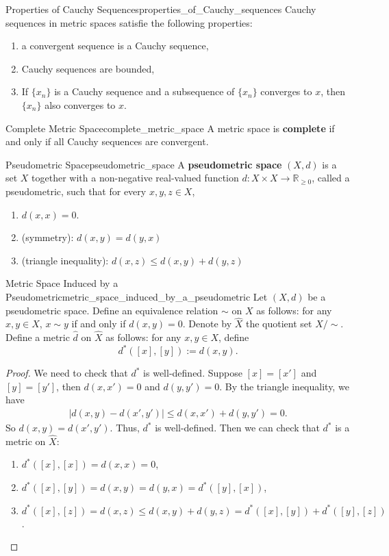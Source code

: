 \documentclass{report}
\begin{document}
\begin{proposition}{Properties of Cauchy Sequences}{properties_of_Cauchy_sequences}
	Cauchy sequences in metric spaces satisfie the following properties:
	\begin{enumerate}
		\item a convergent sequence is a Cauchy sequence,
		\item Cauchy sequences are bounded,
		\item If $\{x_n\}$ is a Cauchy sequence and a subsequence of $\{x_n\}$ converges to $x$, then $\{x_n\}$ also converges to $x$.
	\end{enumerate}
\end{proposition}

\begin{definition}{Complete Metric Space}{complete_metric_space}
	A metric space is \textbf{complete} if and only if all Cauchy sequences are convergent.
\end{definition}

\begin{definition}{Pseudometric Space}{pseudometric_space}
	A \textbf{pseudometric space} $(X, d)$ is a set $X$ together with a non-negative real-valued function $d: X \times X \longrightarrow \mathbb{R}_{\geq 0}$, called a pseudometric, such that for every $x, y, z \in X$,
	\begin{enumerate}
		\item $d(x, x)=0$.
		\item (symmetry): $d(x, y)=d(y, x)$
		\item (triangle inequality): $d(x, z) \leq d(x, y)+d(y, z)$
	\end{enumerate}
\end{definition}

\begin{definition}{Metric Space Induced by a Pseudometric}{metric_space_induced_by_a_pseudometric}
	Let $(X,d)$ be a pseudometric space. Define an equivalence relation $\sim$ on $X$ as follows: for any $x,y\in X$, $x\sim y$ if and only if $d(x,y)=0$. Denote by $\widehat{X}$ the quotient set $X/\sim$. Define a metric $\hat{d}$ on $\widehat{X}$ as follows: for any $x,y\in X$, define
	\[
		d^*([x],[y]):=d(x,y).
	\]
\end{definition}
\begin{proof}
	We need to check that $d^*$ is well-defined. Suppose $[x]=[x']$ and $[y]=[y']$, then $d(x,x')=0$ and $d(y,y')=0$. By the triangle inequality, we have
	\begin{align*}
		|d(x,y)-d(x',y')|\le d(x,x')+d(y,y')=0.
	\end{align*}
	So $d(x,y)=d(x',y')$. Thus, $d^*$ is well-defined.
	Then we can check that $d^*$ is a metric on $\widehat{X}$:
	\begin{enumerate}
		\item $d^*([x],[x])=d(x,x)=0$,
		\item $d^*([x],[y])=d(x,y)=d(y,x)=d^*([y],[x])$,
		\item $d^*([x],[z])=d(x,z)\le d(x,y)+d(y,z)=d^*([x],[y])+d^*([y],[z])$.
	\end{enumerate}
\end{proof}
\end{document}
